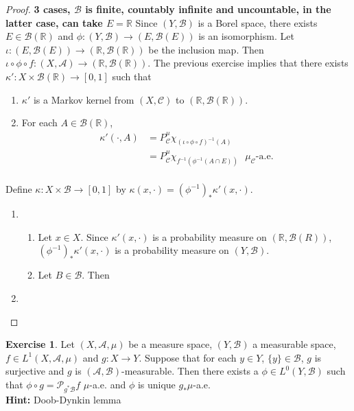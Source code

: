 \documentclass{book}
\theoremstyle{definition}
\newtheorem{ex}[definition]{Exercise}
\newcommand{\kap}{\kappa}
\newcommand{\R}{\mathbb{R}}
\newcommand{\MA}{\mathcal{A}}
\newcommand{\MB}{\mathcal{B}}
\newcommand{\MC}{\mathcal{C}}
\newcommand{\MP}{\mathcal{P}}
\DeclareMathOperator*{\0}{\mbf{0}}
\DeclareMathOperator*{\1}{\mbf{1}}
\begin{document}
	\begin{proof} \textbf{3 cases, $\MB$ is finite, countably infinite and uncountable, in the latter case, can take $E = \R$}
		Since $(Y, \MB)$ is a Borel space, there exists $E \in \MB(\R)$ and $\phi: (Y, \MB) \rightarrow (E, \MB(E) )$ is an isomorphism. Let $\iota: (E, \MB(E)) \rightarrow (\R, \MB(\R))$ be the inclusion map. Then $\iota \circ \phi \circ f : (X, \MA) \rightarrow (\R, \MB(\R))$. The previous exercise implies that there exists $\kap': X \times \MB(\R) \rightarrow [0,1]$ such that  	
		\begin{enumerate}
			\item $\kap'$ is a Markov kernel from $(X, \MC)$ to $(\R, \MB(\R))$.
			\item For each $A \in \MB(\R)$,  
			\begin{align*}
				\kap'(\cdot, A) 
				& = P^{\mu}_{\MC}\chi_{(\iota \circ \phi \circ f)^{-1}(A)} \\
				& = P^{\mu}_{\MC}\chi_{f^{-1}(\phi^{-1}(A \cap E))} \text{ $\mu_{\MC}$-a.e.}\\
			\end{align*}
		\end{enumerate}
		Define $\kap: X \times \MB \rightarrow [0,1]$ by $\kap(x, \cdot) = (\phi^{-1})_*\kap'(x, \cdot)$. 
		\begin{enumerate}
			\item
			\begin{enumerate}
				\item  Let $x \in X$. Since $\kap'(x, \cdot)$ is a probability measure on $(\R, \MB(R))$, $(\phi^{-1})_*\kap'(x, \cdot)$ is a probability measure on $(Y, \MB)$.
				\item Let $B \in \MB$. Then 
			\end{enumerate}
			\item 
		\end{enumerate}
	\end{proof}
	
	\begin{ex} 
		Let $(X, \MA, \mu)$ be a measure space, $(Y, \MB)$ a measurable space, $f \in L^1(X, \MA, \mu)$ and $g: X \rightarrow Y$. Suppose that for each $y \in Y$, $\{y\} \in \MB$, $g$ is surjective and $g$ is $(\MA, \MB)$-measurable. Then there exists a $\phi \in L^0(Y, \MB)$ such that $\phi \circ g = \MP_{g^*\MB}f$ $\mu$-a.e. and $\phi$ is unique $g_*\mu$-a.e. \\
		\textbf{Hint:} Doob-Dynkin lemma
	\end{ex}	
	
\end{document}
